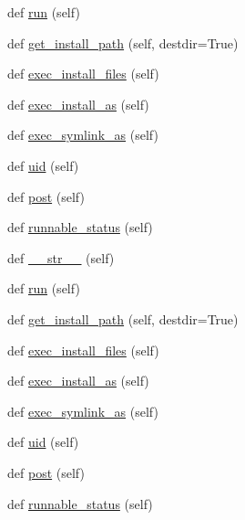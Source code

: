 \begin{DoxyCompactItemize}
\item 
def \hyperlink{classwaflib_1_1_build_1_1inst_a0d03fc4440c06aff0a927181771439be}{run} (self)
\item 
def \hyperlink{classwaflib_1_1_build_1_1inst_ac41fdf31d2133d81d941b1bd68ed31f6}{get\+\_\+install\+\_\+path} (self, destdir=True)
\item 
def \hyperlink{classwaflib_1_1_build_1_1inst_abf856d52d82ec26f4cc6f76a7c01ac8b}{exec\+\_\+install\+\_\+files} (self)
\item 
def \hyperlink{classwaflib_1_1_build_1_1inst_a0c951c9f7df7638fd030f2b4e1822a62}{exec\+\_\+install\+\_\+as} (self)
\item 
def \hyperlink{classwaflib_1_1_build_1_1inst_adf421fc92d636c0b2380b8fcd1a54de6}{exec\+\_\+symlink\+\_\+as} (self)
\item 
def \hyperlink{classwaflib_1_1_build_1_1inst_af3a833db8b118c295a773017f405de79}{uid} (self)
\item 
def \hyperlink{classwaflib_1_1_build_1_1inst_a747341176f2295022038ca17cf839769}{post} (self)
\item 
def \hyperlink{classwaflib_1_1_build_1_1inst_affb0a840290ad8e000488cc0099950ed}{runnable\+\_\+status} (self)
\item 
def \hyperlink{classwaflib_1_1_build_1_1inst_a32507c568f479fd6409906270834783e}{\+\_\+\+\_\+str\+\_\+\+\_\+} (self)
\item 
def \hyperlink{classwaflib_1_1_build_1_1inst_a0d03fc4440c06aff0a927181771439be}{run} (self)
\item 
def \hyperlink{classwaflib_1_1_build_1_1inst_ac41fdf31d2133d81d941b1bd68ed31f6}{get\+\_\+install\+\_\+path} (self, destdir=True)
\item 
def \hyperlink{classwaflib_1_1_build_1_1inst_abf856d52d82ec26f4cc6f76a7c01ac8b}{exec\+\_\+install\+\_\+files} (self)
\item 
def \hyperlink{classwaflib_1_1_build_1_1inst_a0c951c9f7df7638fd030f2b4e1822a62}{exec\+\_\+install\+\_\+as} (self)
\item 
def \hyperlink{classwaflib_1_1_build_1_1inst_adf421fc92d636c0b2380b8fcd1a54de6}{exec\+\_\+symlink\+\_\+as} (self)
\item 
def \hyperlink{classwaflib_1_1_build_1_1inst_af3a833db8b118c295a773017f405de79}{uid} (self)
\item 
def \hyperlink{classwaflib_1_1_build_1_1inst_a747341176f2295022038ca17cf839769}{post} (self)
\item 
def \hyperlink{classwaflib_1_1_build_1_1inst_affb0a840290ad8e000488cc0099950ed}{runnable\+\_\+status} (self)

\end{DoxyCompactItemize}
